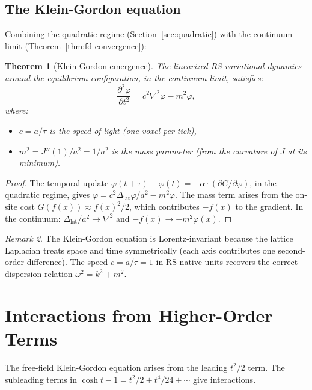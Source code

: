 \documentclass[11pt,a4paper]{article}
\theoremstyle{plain}
\newtheorem{theorem}{Theorem}[section]
\theoremstyle{definition}
\theoremstyle{remark}
\newtheorem{remark}[theorem]{Remark}
\newcommand{\Jcost}{J}
\newcommand{\Jlog}{G}
\newcommand{\Lap}{\Delta_{\mathrm{lat}}}
\begin{document}
\subsection{The Klein-Gordon equation}

Combining the quadratic regime (Section~\ref{sec:quadratic}) with the
continuum limit (Theorem~\ref{thm:fd-convergence}):

\begin{theorem}[Klein-Gordon emergence]
\label{thm:kg}
The linearized RS variational dynamics around the equilibrium
configuration, in the continuum limit, satisfies:
\[
  \frac{\partial^2 \varphi}{\partial t^2} = c^2 \nabla^2 \varphi - m^2 \varphi,
\]
where:
\begin{itemize}[nosep]
\item $c = a/\tau$ is the speed of light (one voxel per tick),
\item $m^2 = \Jcost''(1)/a^2 = 1/a^2$ is the mass parameter
  (from the curvature of $\Jcost$ at its minimum).
\end{itemize}
\end{theorem}

\begin{proof}
The temporal update $\varphi(t+\tau) - \varphi(t) = -\alpha \cdot
(\partial C/\partial \varphi)$, in the quadratic regime, gives
$\ddot\varphi = c^2 \Lap \varphi / a^2 - m^2 \varphi$.  The mass
term arises from the on-site cost $\Jlog(f(x)) \approx f(x)^2/2$,
which contributes $-f(x)$ to the gradient.  In the continuum:
$\Lap/a^2 \to \nabla^2$ and $-f(x) \to -m^2\varphi(x)$.
\end{proof}

\begin{remark}
The Klein-Gordon equation is Lorentz-invariant because the lattice
Laplacian treats space and time symmetrically (each axis contributes
one second-order difference).  The speed $c = a/\tau = 1$ in RS-native
units recovers the correct dispersion relation $\omega^2 = k^2 + m^2$.
\end{remark}

\section{Interactions from Higher-Order Terms}
\label{sec:interactions}

The free-field Klein-Gordon equation arises from the leading $t^2/2$
term.  The subleading terms in $\cosh t - 1 = t^2/2 + t^4/24 + \cdots$
give interactions.
\end{document}
